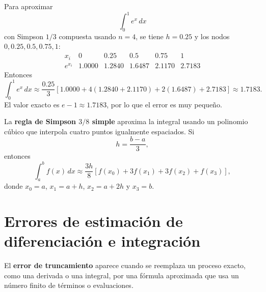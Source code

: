 \documentclass[a4,11pt]{aleph-notas}
\begin{document}
\begin{pscodigo}
\begin{function}[H]
\end{function}
\end{pscodigo}

\begin{ejem}
    Para aproximar
    \[
        \int_0^1 e^x\,dx
    \]
    con Simpson $1/3$ compuesta usando $n=4$, se tiene $h=0.25$ y los nodos $0,0.25,0.5,0.75,1$:
    \[
        \begin{array}{c|ccccc}
            x_i & 0 & 0.25 & 0.5 & 0.75 & 1\\
            \hline
            e^{x_i} & 1.0000 & 1.2840 & 1.6487 & 2.1170 & 2.7183
        \end{array}
    \]
    Entonces
    \[
        \int_0^1 e^x\,dx
        \approx
        \frac{0.25}{3}
        \left[
            1.0000+4(1.2840+2.1170)+2(1.6487)+2.7183
        \right]
        \approx
        1.7183.
    \]
    El valor exacto es $e-1\approx 1.7183$, por lo que el error es muy pequeño.
\end{ejem}

\begin{defi}
    La \textbf{regla de Simpson $3/8$ simple} aproxima la integral usando un polinomio cúbico que interpola cuatro puntos igualmente espaciados. Si
    \[
        h=\frac{b-a}{3},
    \]
    entonces
    \[
        \int_a^b f(x)\,dx
        \approx
        \frac{3h}{8}\left[f(x_0)+3f(x_1)+3f(x_2)+f(x_3)\right],
    \]
    donde $x_0=a$, $x_1=a+h$, $x_2=a+2h$ y $x_3=b$.
\end{defi}

\section{Errores de estimación de diferenciación e integración}

\begin{defi}
    El \textbf{error de truncamiento} aparece cuando se reemplaza un proceso exacto, como una derivada o una integral, por una fórmula aproximada que usa un número finito de términos o evaluaciones.
\end{defi}
\end{document}
